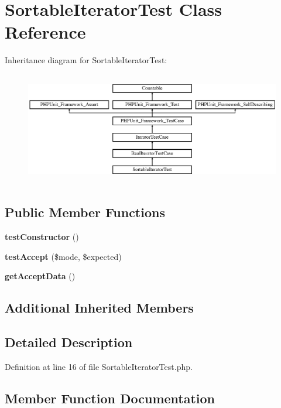 \section{Sortable\+Iterator\+Test Class Reference}
\label{class_symfony_1_1_component_1_1_finder_1_1_tests_1_1_iterator_1_1_sortable_iterator_test}
Inheritance diagram for Sortable\+Iterator\+Test\+:\begin{figure}[H]
\begin{center}
\leavevmode
\includegraphics[height=4.955752cm]{class_symfony_1_1_component_1_1_finder_1_1_tests_1_1_iterator_1_1_sortable_iterator_test}
\end{center}
\end{figure}
\subsection*{Public Member Functions}
\begin{DoxyCompactItemize}
\item 
{\bf test\+Constructor} ()
\item 
{\bf test\+Accept} (\$mode, \$expected)
\item 
{\bf get\+Accept\+Data} ()
\end{DoxyCompactItemize}
\subsection*{Additional Inherited Members}


\subsection{Detailed Description}


Definition at line 16 of file Sortable\+Iterator\+Test.\+php.



\subsection{Member Function Documentation}
